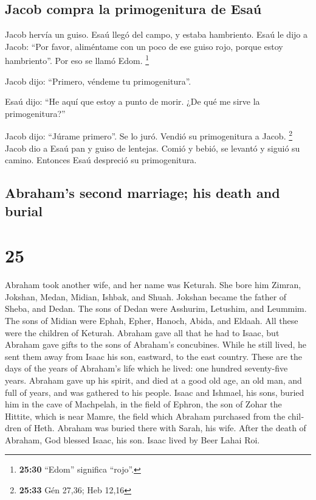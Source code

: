 \begin{paracol}{2}
\hypertarget{jacob-compra-la-primogenitura-de-esauxfa}{%
\subsection{Jacob compra la primogenitura de
Esaú}\label{jacob-compra-la-primogenitura-de-esauxfa}}

 Jacob hervía un guiso. Esaú llegó del campo, y estaba
hambriento.  Esaú le dijo a Jacob: ``Por favor,
aliméntame con un poco de ese guiso rojo, porque estoy hambriento''. Por
eso se llamó Edom. \footnote{\textbf{25:30} ``Edom'' significa ``rojo''.}

 Jacob dijo: ``Primero, véndeme tu primogenitura''.

 Esaú dijo: ``He aquí que estoy a punto de morir. ¿De qué
me sirve la primogenitura?''

 Jacob dijo: ``Júrame primero''. Se lo juró. Vendió su
primogenitura a Jacob. \footnote{\textbf{25:33} Gén 27,36; Heb 12,16}
 Jacob dio a Esaú pan y guiso de lentejas. Comió y bebió,
se levantó y siguió su camino. Entonces Esaú despreció su primogenitura.

\switchcolumn
\begin{otherlanguage}{english}

\hypertarget{abrahams-second-marriage-his-death-and-burial}{%
\subsection{Abraham's second marriage; his death and
burial}\label{abrahams-second-marriage-his-death-and-burial}}

\hypertarget{section-49}{%
\section{25}\label{section-49}}

 Abraham took another wife, and her name was Keturah.
 She bore him Zimran, Jokshan, Medan, Midian, Ishbak, and
Shuah.  Jokshan became the father of Sheba, and Dedan. The
sons of Dedan were Asshurim, Letushim, and Leummim.  The
sons of Midian were Ephah, Epher, Hanoch, Abida, and Eldaah. All these
were the children of Keturah.  Abraham gave all that he
had to Isaac,  but Abraham gave gifts to the sons of
Abraham's concubines. While he still lived, he sent them away from Isaac
his son, eastward, to the east country.  These are the
days of the years of Abraham's life which he lived: one hundred
seventy-five years.  Abraham gave up his spirit, and died
at a good old age, an old man, and full of years, and was gathered to
his people.  Isaac and Ishmael, his sons, buried him in
the cave of Machpelah, in the field of Ephron, the son of Zohar the
Hittite, which is near Mamre,  the field which Abraham
purchased from the children of Heth. Abraham was buried there with
Sarah, his wife.  After the death of Abraham, God blessed
Isaac, his son. Isaac lived by Beer Lahai Roi.


\end{otherlanguage}
\end{paracol}
